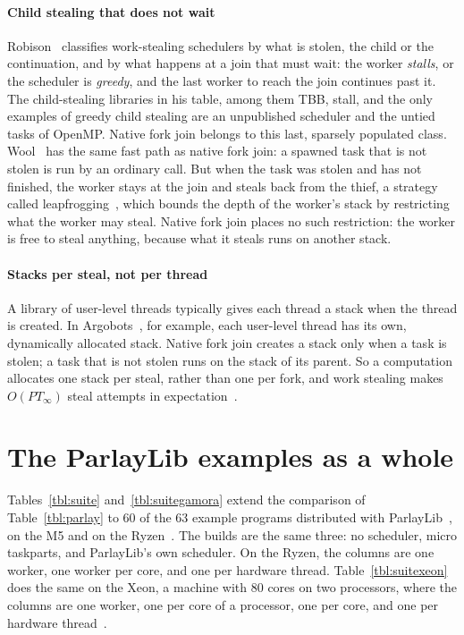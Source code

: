 \documentclass[sigplan,nonacm]{acmart}
\begin{document}
\paragraph{Child stealing that does not wait}
%
Robison~\cite{robison2014primer} classifies work-stealing schedulers by
what is stolen, the child or the continuation, and by what happens at
a join that must wait: the worker \emph{stalls}, or the scheduler is
\emph{greedy}, and the last worker to reach the join continues past it.
%
The child-stealing libraries in his table, among them TBB, stall, and
the only examples of greedy child stealing are an unpublished scheduler
and the untied tasks of OpenMP.
%
Native fork join belongs to this last, sparsely populated class.
%
Wool~\cite{faxen2008wool} has the same fast path as native fork join:
a spawned task that is not stolen is run by an ordinary call.
%
But when the task was stolen and has not finished, the worker stays at
the join and steals back from the thief, a strategy called
leapfrogging~\cite{wagner1993leapfrogging}, which bounds the depth of
the worker's stack by restricting what the worker may steal.
%
Native fork join places no such restriction: the worker is free to
steal anything, because what it steals runs on another stack.

\paragraph{Stacks per steal, not per thread}
%
A library of user-level threads typically gives each thread a stack
when the thread is created.
%
In Argobots~\cite{seo2018argobots}, for example, each user-level thread
has its own, dynamically allocated stack.
%
Native fork join creates a stack only when a task is stolen; a task
that is not stolen runs on the stack of its parent.
%
So a computation allocates one stack per steal, rather than one per
fork, and work stealing makes $O(PT_\infty)$ steal attempts in
expectation~\cite{blumofele99,arora98}.

\section{The ParlayLib examples as a whole}
\label{sec:suite}

Tables~\ref{tbl:suite} and~\ref{tbl:suitegamora} extend the comparison
of Table~\ref{tbl:parlay} to 60 of the 63 example programs distributed
with ParlayLib~\cite{blelloch20parlaylib}, on the M5 and on the
Ryzen~\cite{flexibench-suite,flexibench-suitegamora}.
%
The builds are the same three: no scheduler, micro taskparts, and
ParlayLib's own scheduler.
%
On the Ryzen, the columns are one worker, one worker per core, and one
per hardware thread.
%
Table~\ref{tbl:suitexeon} does the same on the Xeon, a machine with
80 cores on two processors, where the columns are one worker, one per
core of a processor, one per core, and one per hardware
thread~\cite{flexibench-suiteicelake}.
\end{document}
